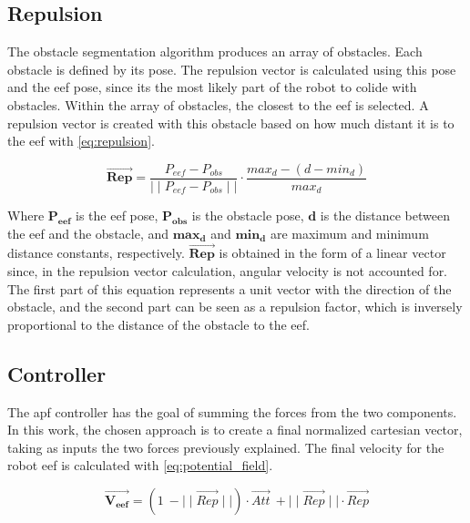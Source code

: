 \subsection{Repulsion}
\label{ssec:repulsion}

\par The obstacle segmentation algorithm produces an array of obstacles. Each obstacle is defined by its pose. The repulsion vector is calculated using this pose and the \ac{eef} pose, since its the most likely part of the robot to colide with obstacles. Within the array of obstacles, the closest to the \ac{eef} is selected. A repulsion vector is created with this obstacle based on how much distant it is to the \ac{eef} with \autoref{eq:repulsion}.

\begin{equation}
    \vec{\mathbf{Rep}} = \frac{P_{eef}-P_{obs}}{\mid\mid P_{eef}-P_{obs} \mid\mid}\cdot\frac{max_d-(d-min_d)}{max_d} 
    \label{eq:repulsion}
\end{equation}

\noindent Where $\mathbf{P_{eef}}$ is the \ac{eef} pose, $\mathbf{P_{obs}}$ is the obstacle pose, $\mathbf{d}$ is the distance between the \ac{eef} and the obstacle, and $\mathbf{max_d}$ and $\mathbf{min_d}$ are maximum and minimum distance constants, respectively. $\vec{\mathbf{Rep}}$ is obtained in the form of a linear vector since, in the repulsion vector calculation, angular velocity is not accounted for. The first part of this equation represents a unit vector with the direction of the obstacle, and the second part can be seen as a repulsion factor, which is inversely proportional to the distance of the obstacle to the \ac{eef}.

\subsection{Controller}

\par The \ac{apf} controller has the goal of summing the forces from the two components. In this work, the chosen approach is to create a final normalized cartesian vector, taking as inputs the two forces previously explained. The final velocity for the robot \ac{eef} is calculated with \autoref{eq:potential_field}.

\begin{equation}
    \vec{\mathbf{V_{eef}}}=(1\:-\mid\mid\vec{Rep}\mid\mid)\cdot\vec{Att}\:+\mid\mid\vec{Rep}\mid\mid\cdot \vec{Rep}
    \label{eq:potential_field}
\end{equation}

